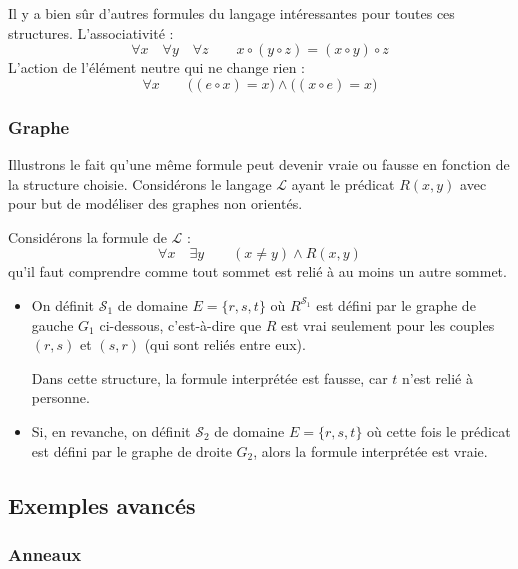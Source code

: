 \documentclass[11pt,class=report,crop=false]{standalone}
\begin{document}
Il y a bien sûr d'autres formules du langage intéressantes pour toutes ces structures.
L'associativité :
\[
\forall x \quad \forall y \quad \forall z \qquad x \circ (y \circ z) = (x \circ y) \circ z
\]
L'action de l'élément neutre qui ne change rien :
\[
\forall x \qquad \big( (e \circ x) = x \big) \land \big( (x \circ e) = x \big)
\]

\subsubsection{Graphe}

Illustrons le fait qu'une même formule peut devenir vraie ou fausse en fonction de la structure choisie.
Considérons le langage $\mathcal{L}$ ayant le prédicat $R(x,y)$ avec pour but de modéliser des graphes non orientés.

Considérons la formule de $\mathcal{L}$ :
\[
\forall x \quad \exists y \qquad (x \neq y) \land R(x,y)
\]
qu'il faut comprendre comme \og{}tout sommet est relié à au moins un autre sommet\fg{}.

\begin{itemize}
	\item On définit $\mathcal{S}_1$ de domaine $E = \{r, s, t\}$
	où $R^{\mathcal{S}_1}$ est défini par le graphe de gauche $G_1$ ci-dessous, c'est-à-dire
	que $R$ est vrai seulement pour les couples $(r,s)$ et $(s,r)$ (qui sont reliés entre eux).
	
	Dans cette structure, la formule interprétée est fausse, car $t$ n'est relié à personne.

	\item Si, en revanche, on définit $\mathcal{S}_2$ de domaine $E = \{r, s, t\}$
où cette fois le prédicat est défini par le graphe de droite $G_2$, alors la formule interprétée est vraie.

\end{itemize}







\subsection{Exemples avancés}

\subsubsection{Anneaux}
\end{document}
